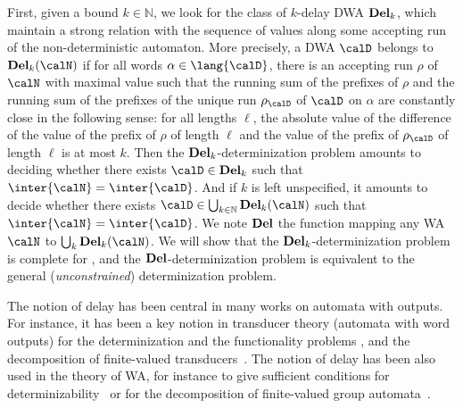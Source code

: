 First, given a bound $k\in\mathbb{N}$, we look for the class of $k$-delay DWA
${\bf Del}_k$, which maintain a strong relation with the sequence of values
along some accepting run of the non-deterministic automaton. More
precisely, a DWA $\calD$ belongs to ${\bf Del}_k(\calN)$ if for all words $\alpha \in
\lang{\calD}$, there is an accepting run $\rho$ of $\calN$ with maximal value
such that the running sum of the prefixes of $\rho$ and the running sum of the
prefixes of the unique run $\rho_{\calD}$ of $\calD$ on $\alpha$ are constantly
close in the following sense: for all lengths $\ell$, the absolute value of the
difference of the value of the prefix of $\rho$ of length $\ell$ and
the value of the prefix of $\rho_\calD$ of length $\ell$ is at most $k$.
Then the ${\bf
Del}_k$-determinization problem amounts to deciding whether there exists
${\calD} \in {\bf Del}_k$ such that $\inter{\calN}=\inter{\calD}$.  And if $k$
is left unspecified, it amounts to decide whether there exists ${\calD} \in
\bigcup_{k \in {\mathbb{N}}} {\bf Del}_k(\calN)$ such that
$\inter{\calN}=\inter{\calD}$. We note ${\bf Del}$ the function mapping any WA
$\calN$ to $\bigcup_k {\bf Del}_k(\calN)$. We will show that the ${\bf
Del}_k$-determinization problem is  complete for \EXP, and the ${\bf
Del}$-determinization problem is equivalent to the general ({\it unconstrained})
determinization problem.

The notion of delay has been central in many works on automata with
outputs. For instance, it has been a key notion in transducer theory
(automata with word outputs) for the determinization and the
functionality problems \cite{journals/tcs/BealCPS03},  and the decomposition of finite-valued
transducers~\cite{sakarovitch_et_al:LIPIcs:2008:1324}. The notion of delay has been also used in the
theory of WA, for instance to give sufficient conditions for
determinizability~\cite{Mohri_FiniteState_CoLing} or for the decomposition of finite-valued group
automata~\cite{DBLP:conf/fsttcs/FiliotGR14}. 

